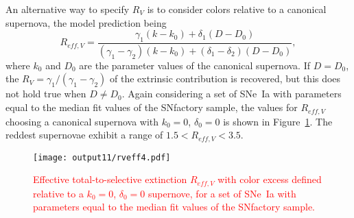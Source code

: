 \documentclass{aastex}   	%
\begin{document}
An alternative way to specify $R_V$ is to consider colors relative to a canonical supernova,
 the model prediction being
\begin{equation}
R_{eff, V} = \frac{\gamma_1  (k-k_0) + \delta_1 (D-D_0) }{(\gamma_1-\gamma_2) (k-k_0) + (\delta_1-\delta_2) (D-D_0) },
\end{equation}
where $k_0$ and $D_0$ are the parameter values of the canonical supernova.
If $D = D_0$, the $R_V = \gamma_1/(\gamma_1-\gamma_2)$ of the extrinsic contribution is recovered, but this does not hold true
when $D \ne D_0$.  Again considering a set of SNe~Ia  with parameters equal to the median fit values of the SNfactory sample,
the values for $R_{eff,V}$ choosing a canonical supernova with $k_0=0$, $\delta_0=0$  is shown in Figure~\ref{rv4:fig}.
The reddest supernovae exhibit a range of $1.5< R_{eff,V}<3.5$. 

\begin{figure}[htbp] %
   \centering
   \texttt{[image: output11/rveff4.pdf]}
      \caption{\textcolor{red}{Effective total-to-selective extinction $R_{eff, V}$
      with color excess defined relative to  a
      $k_0=0$, $\delta_0=0$ supernove,  for  a set of SNe~Ia  with parameters equal to the median fit values of the SNfactory sample.}
   \label{rv4:fig}}
\end{figure}


\color{black}

%
\end{document}
